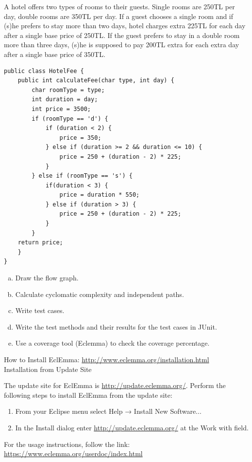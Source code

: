 \begin{exercise}
    A hotel offers two types of rooms to their guests. Single rooms are 250TL per day, double rooms are 350TL per day. If a guest chooses a single room and if (s)he prefers to stay more than two days, hotel charges extra 225TL for each day after a single base price of 250TL. If the guest prefers to stay in a double room more than three days, (s)he is supposed to pay 200TL extra for each extra day after a single base price of 350TL.

    \begin{lstlisting}[caption={A hotel fee calculation program for the above requirement.}]
public class HotelFee {
    public int calculateFee(char type, int day) {
        char roomType = type; 
        int duration = day;
        int price = 3500;
        if (roomType == 'd') {     
            if (duration < 2) {
                price = 350;
            } else if (duration >= 2 && duration <= 10) {
                price = 250 + (duration - 2) * 225;
            }
        } else if (roomType == 's') {
            if(duration < 3) {
                price = duration * 550;
            } else if (duration > 3) {
                price = 250 + (duration - 2) * 225;
            } 
        } 
    return price;
    }
}
    \end{lstlisting}
    
    \begin{enumerate}[a),nosep]
        \item Draw the flow graph.
        \item Calculate cyclomatic complexity and independent paths.
        \item Write test cases.
        \item Write the test methods and their results for the test cases in JUnit.
        \item Use a coverage tool (Eclemma) to check the coverage percentage.
    \end{enumerate}
    
    How to Install EclEmma: \url{http://www.eclemma.org/installation.html}\\
    Installation from Update Site

    The update site for EclEmma is \url{http://update.eclemma.org/}. Perform the following steps to install EclEmma from the update site:

    \begin{enumerate}[nosep]
        \item From your Eclipse menu select Help → Install New Software...
        \item In the Install dialog enter \url{http://update.eclemma.org/} at the Work with field.
    \end{enumerate}
    
    For the usage instructions, follow the link: \url{https://www.eclemma.org/userdoc/index.html}
\end{exercise}

